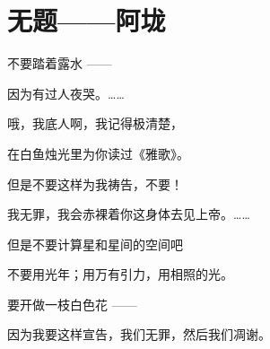 \section{无题——阿垅}

不要踏着露水 ——

因为有过人夜哭。……


哦，我底人啊，我记得极清楚，

在白鱼烛光里为你读过《雅歌》。


但是不要这样为我祷告，不要！

我无罪，我会赤裸着你这身体去见上帝。……


但是不要计算星和星间的空间吧

不要用光年；用万有引力，用相照的光。


要开做一枝白色花 ——

因为我要这样宣告，我们无罪，然后我们凋谢。
